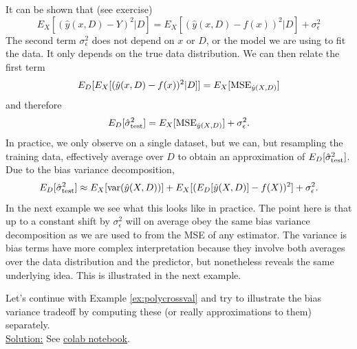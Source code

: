 It can be shown that (see exercise)
\begin{equation}\label{eq:EXhaty}
E_X[(\hat{y}(x,D)- Y)^2|D] = E_X[(\hat{y}(x,D)- f(x))^2|D] + \sigma_{\epsilon}^2
\end{equation}
The second term $\sigma_{\epsilon}^2$ does not depend on $x$ or $D$, or the model we are using to fit the data. It only depends on the true  data distribution. 
We can then relate the first term 
\begin{equation}
E_D[E_X[(\hat{y}(x,D)- f(x))^2|D]] = E_X[{\rm MSE}_{\hat{y}(X,D)}]
\end{equation}
and therefore 
\begin{equation}
E_D[\hat{\sigma}_{\rm test}^2] = E_X[{\rm MSE}_{\hat{y}(X,D)}] + \sigma_{\epsilon}^2.
\end{equation}
In practice, we only observe on a single dataset, but we can, but resampling the training data, effectively average over $D$ to obtain an approximation of  $E_D[\hat{\sigma}_{\rm test}^2]$. Due to the bias variance decomposition, 
\begin{equation}
E_D[\hat{\sigma}_{\rm test}^2] \approx E_X[{\rm var}(\hat{y}(X,D))] + E_X[(E_D[\hat{y}(X,D)] - f(X))^2] + \sigma_{\epsilon}^2.
\end{equation}
In the next example we see what this looks like in practice.  The point here is that up to a constant shift by $\sigma_{\epsilon}^2$ will on average obey the same bias variance decomposition as we are used to from the MSE of any estimator. The variance is bias terms have more complex interpretation because they involve both averages over the data distribution and the predictor, but nonetheless reveals the same underlying idea. This is illustrated in the next example. 






\begin{example}

Let's continue with Example \ref{ex:polycrossval} and try to illustrate the bias variance tradeoff by computing these (or really approximations to them) separately. \\


\noindent
\underline{Solution:}  See \href{https://colab.research.google.com/drive/1EYcMviowfsnsVe7vsUKlyzkNsddUiTau?usp=sharing}{colab notebook}.

\end{example}

